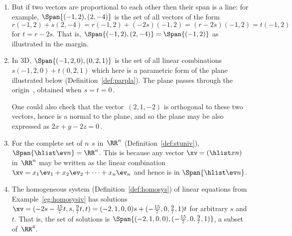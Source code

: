\begin{example}
\begin{enumerate}
\item But if two vectors are proportional to each other then their span is a line: 
%
for example, \(\Span\{(-1,2),(2,-4)\}\) is the set of all vectors of the form \(r(-1,2)+s(2,-4)=r(-1,2)+(-2s)(-1,2)=(r-2s)(-1,2)=t(-1,2)\) for \(t=r-2s\).  
That is, \(\Span\{(-1,2),(2,-4)\}=\Span\{(-1,2)\}\) as illustrated in the margin.

\item  In 3D, \(\Span\{(-1,2,0),(0,2,1)\}\) is the set of all linear combinations \(s(-1,2,0)+t(0,2,1)\) which here is a parametric form of the plane illustrated below (Definition~\ref{def:parpla}).  
The plane passes through the origin~\ov, obtained when \(s=t=0\)\,.
\begin{center}
 {}
\end{center}
One could also check that the vector~\((2,1,-2)\) is orthogonal to these two vectors, hence is a normal to the plane, and so the plane may be also expressed as \(2x+y-2z=0\)\,.

\item For the complete set of \(n\)~s in~\(\RR^n\) (Definition~\ref{def:stuniv}), \(\Span\{\hlist\ev n\}=\RR^n\).
This is because any vector \(\xv=(\hlist xn)\) in~\(\RR^n\) may be written as the linear combination \(\xv=x_1\ev_1+x_2\ev_2+\cdots+x_n\ev_n\) and hence is in \(\Span\{\hlist\ev n\}\).


\item The homogeneous system (Definition~\ref{def:homosys}) of linear equations from Example~\ref{eg:homosysiv} has solutions \(\xv=(-2s-\frac{15}7t,s,\frac97t,t) =(-2,1,0,0)s+(-\frac{15}7,0,\frac97,1)t\) for arbitrary \(s\) and~\(t\).
That is, the set of solutions is \(\Span\{(-2,1,0,0),\linebreak[1](-\frac{15}7,0,\frac97,1)\}\), a subset of~\(\RR^4\).


\end{enumerate}
\end{example}
